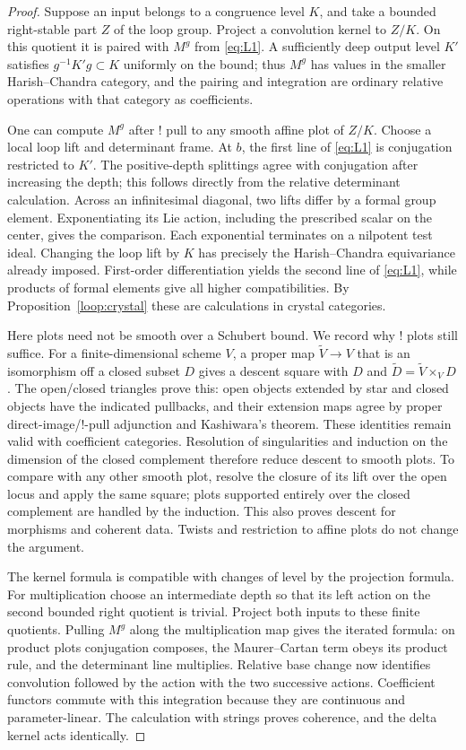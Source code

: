 \documentclass[11pt]{article}
\numberwithin{equation}{section}
\theoremstyle{definition}
\theoremstyle{remark}
\begin{document}
\begin{proof}
Suppose an input belongs to a congruence level $K$, and take a bounded
right-stable part $Z$ of the loop group.  Project a convolution kernel
to $Z/K$.  On this quotient it is paired with $M^g$ from
\eqref{eq:L1}.  A sufficiently deep output level $K'$ satisfies
$g^{-1}K'g\subset K$ uniformly on the bound; thus $M^g$ has values in
the smaller Harish--Chandra category, and the pairing and integration
are ordinary relative operations with that category as coefficients.

One can compute $M^g$ after ! pull to any smooth affine plot of $Z/K$.
Choose a local loop lift and determinant frame.  At $b$, the first
line of \eqref{eq:L1} is conjugation restricted to $K'$.  The
positive-depth splittings agree with conjugation after increasing
the depth; this follows directly from the relative determinant
calculation.  Across an infinitesimal diagonal, two lifts differ by
a formal group element.  Exponentiating its Lie action, including
the prescribed scalar on the center, gives the comparison.  Each
exponential terminates on a nilpotent test ideal.  Changing the loop
lift by $K$ has precisely the Harish--Chandra equivariance already
imposed.  First-order differentiation yields the second line of
\eqref{eq:L1}, while products of formal elements give all higher
compatibilities.  By Proposition~\ref{loop:crystal} these are
calculations in crystal categories.

Here plots need not be smooth over a Schubert bound.  We record why
! plots still suffice.  For a finite-dimensional scheme $V$, a proper
map $\widetilde V\to V$ that is an isomorphism off a closed subset
$D$ gives a descent square with $D$ and
$\widetilde D=\widetilde V\times_VD$.  The open/closed triangles
prove this: open objects extended by star and closed objects have
the indicated pullbacks, and their extension maps agree by proper
direct-image/!-pull adjunction and Kashiwara's theorem.  These
identities remain valid with coefficient categories.  Resolution
of singularities and induction on the dimension of the closed
complement therefore reduce descent to smooth plots.  To compare
with any other smooth plot, resolve the closure of its lift over
the open locus and apply the same square; plots supported entirely
over the closed complement are handled by the induction.  This
also proves descent for morphisms and coherent data.  Twists and
restriction to affine plots do not change the argument.

The kernel formula is compatible with changes of level by the
projection formula.  For multiplication choose an intermediate
depth so that its left action on the second bounded right
quotient is trivial.  Project both inputs to these finite
quotients.  Pulling $M^g$ along the multiplication map gives the
iterated formula: on product plots conjugation composes, the
Maurer--Cartan term obeys its product rule, and the determinant
line multiplies.  Relative base change now identifies convolution
followed by the action with the two successive actions.
Coefficient functors commute with this integration because they
are continuous and parameter-linear.  The calculation with
strings proves coherence, and the delta kernel acts identically.


\end{proof}
\end{document}

